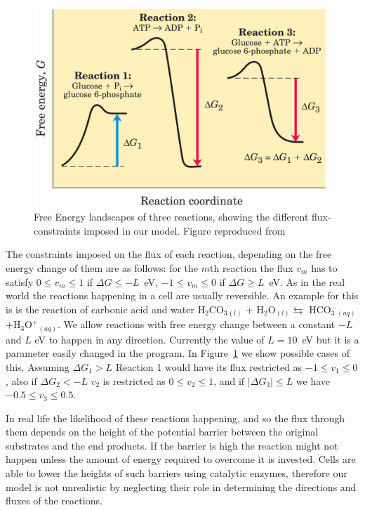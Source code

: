 \documentclass[a4paper,12pt]{article}
\begin{document}
	\begin{figure}[htpb]
		\centering
		\includegraphics[width=0.6\linewidth]{freeEchangeFig.png}
		\caption{Free Energy landscapes of three reactions, showing the different flux-constraints imposed in our model. Figure reproduced from \cite{principlesofbio}}
		\label{fig:freeEchangeFig}
	\end{figure}

	The constraints imposed on the flux of each reaction, depending on the free energy change of them are as follows: for the $m$th reaction the flux $v_m$ has to satisfy $0\leq v_m \leq 1 $ if $\Delta G \leq -L$~eV, $-1\leq v_m \leq 0 $ if $\Delta G \geq L$~eV. As in the real world the reactions happening in a cell are usually reversible.  An example for this is is the reaction of carbonic acid and water H$_2$CO$_3$$_{(l)}$ + H$_2$O$_{(l)} \leftrightarrows$ HCO$^-_3$$_{(aq)}$+H$_3$O$^+$$_{(aq)}$. We allow reactions with free energy change between a constant $-L$ and $L$ eV to happen in any direction. Currently the value of $L=10$~eV but it is a parameter easily changed in the program. In Figure~\ref{fig:freeEchangeFig} we show possible cases of this. Assuming $\Delta G_1 > L$ Reaction 1 would have its flux restricted as $-1\leq v_1 \leq 0$, also if $\Delta G_2 < -L$ $v_2$ is restricted as $0 \leq v_2 \leq 1$, and if $|\Delta G_3 | \leq L$ we have $-0.5 \leq v_3 \leq 0.5$. 

	In real life the likelihood of these reactions happening, and so the flux through them depends on the height of the potential barrier between the original substrates and the end products. If the barrier is high the reaction might not happen unless the amount of energy required to overcome it is invested. Cells are able to lower the heights of such barriers using catalytic enzymes, therefore our model is not unrealistic by neglecting their role in determining the directions and fluxes of the reactions. 
\end{document}

